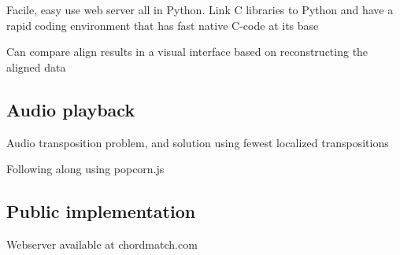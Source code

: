 \item Facile, easy use web server all in Python. Link C libraries to Python and have a rapid coding environment that has fast native C-code at its base

\item Can compare align results in a visual interface based on reconstructing the aligned data

\subsection{Audio playback}

\item Audio transposition problem, and solution using fewest localized transpositions

\item Following along using popcorn.js

\subsection{Public implementation}

\item Webserver available at chordmatch.com